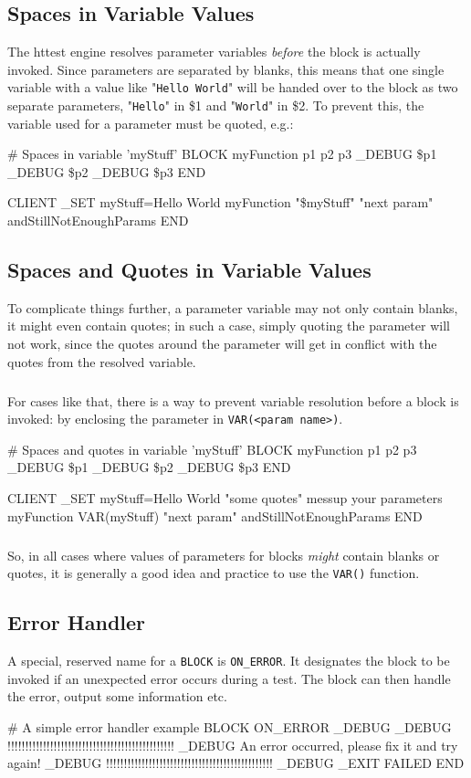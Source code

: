 \subsection{Spaces in Variable Values}
The httest engine resolves parameter variables \textit{before} the block 
is actually invoked. Since parameters are separated by blanks, this means 
that one single variable with a value like "\texttt{Hello World}" will be handed over 
to the block as two separate parameters, "\texttt{Hello}" in \$1 and "\texttt{World}" in \$2. 
To prevent this, the variable used for a parameter must be quoted, e.g.:
\begin{usplisting}
    # Spaces in variable 'myStuff'
    BLOCK myFunction p1 p2 p3
      _DEBUG \$p1
      _DEBUG \$p2
      _DEBUG \$p3
    END 

    CLIENT
      _SET myStuff=Hello World
      myFunction "\$myStuff" "next param" andStillNotEnoughParams
    END
\end{usplisting}

\pagebreak 
\subsection{Spaces and Quotes in Variable Values}
To complicate things further, a parameter variable may not only contain blanks, 
it might even contain quotes; in such a case, simply quoting the parameter will 
not work, since the quotes around the parameter will get in conflict with the 
quotes from the resolved variable.

\subparagraph{}
For cases like that, there is a way to prevent variable resolution before 
a block is invoked: by enclosing the parameter in \texttt{VAR(<param name>)}.
\begin{usplisting}
    # Spaces and quotes in variable 'myStuff'
    BLOCK myFunction p1 p2 p3
      _DEBUG \$p1
      _DEBUG \$p2
      _DEBUG \$p3
    END 

    CLIENT
      _SET myStuff=Hello World "some quotes" messup your parameters
      myFunction VAR(myStuff) "next param" andStillNotEnoughParams
    END
\end{usplisting}

\subparagraph{}
So, in all cases where values of parameters for blocks \textit{might} 
contain blanks or quotes, it is generally a good idea and practice to use the 
\texttt{VAR()} function.

\subsection{Error Handler}
A special, reserved name for a \texttt{BLOCK} is \texttt{ON\_ERROR}. It 
designates the block to be invoked if an unexpected error occurs during 
a test. The block can then handle the error, output some information etc. 
\begin{usplisting}
    # A simple error handler example
    BLOCK ON_ERROR
    _DEBUG
    _DEBUG !!!!!!!!!!!!!!!!!!!!!!!!!!!!!!!!!!!!!!!!!!!!!!!
    _DEBUG An error occurred, please fix it and try again!
    _DEBUG !!!!!!!!!!!!!!!!!!!!!!!!!!!!!!!!!!!!!!!!!!!!!!!
    _DEBUG
    _EXIT FAILED
    END
\end{usplisting}

